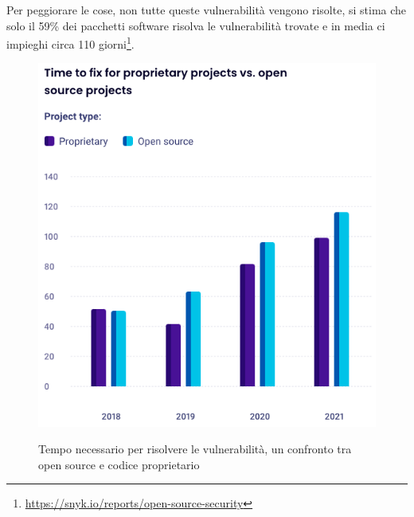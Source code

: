 Per peggiorare le cose, non tutte queste vulnerabilità vengono risolte, si stima che solo il 59\% dei pacchetti software
risolva le vulnerabilità trovate e in media ci impieghi circa 110
giorni\footnote{\url{https://snyk.io/reports/open-source-security}}.
\begin{figure}[h]
    \centering
    \captionsetup{justification=centering}
    \includegraphics[width=12cm]{./chapters/2.wasi-in-depth/images/12.time_to_fix_os_sec.png}
    \label{time_to_fix_security}
    \caption{Tempo necessario per risolvere le vulnerabilità, un confronto tra open source e codice proprietario}
\end{figure}

